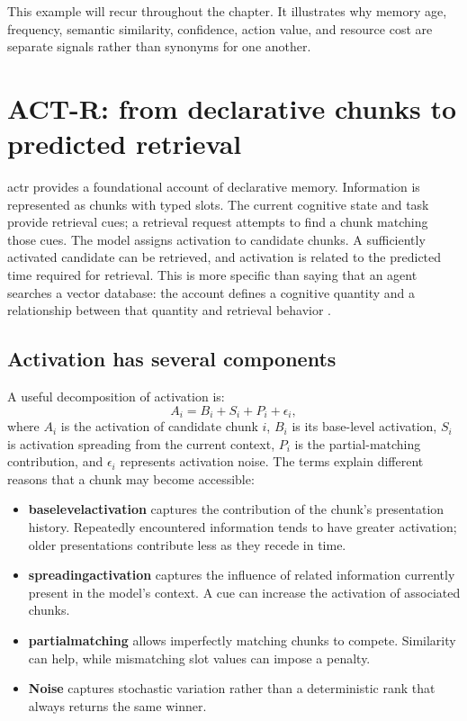 This example will recur throughout the chapter. It illustrates why memory age, frequency, semantic similarity, confidence, action value, and resource cost are separate signals rather than synonyms for one another.

\section{ACT-R: from declarative chunks to predicted retrieval}
\label{sec:ch12-actr}

\gls{actr} provides a foundational account of declarative memory. Information is represented as chunks with typed slots. The current cognitive state and task provide retrieval cues; a retrieval request attempts to find a chunk matching those cues. The model assigns activation to candidate chunks. A sufficiently activated candidate can be retrieved, and activation is related to the predicted time required for retrieval. This is more specific than saying that an agent searches a vector database: the account defines a cognitive quantity and a relationship between that quantity and retrieval behavior \autocite{anderson2007actr}\autocite[pp. 262--267]{actr7manual}.

\subsection{Activation has several components}
\label{subsec:ch12-activation-components}

A useful decomposition of \gls{activation} is:
\begin{equation}
  A_i = B_i + S_i + P_i + \epsilon_i,
  \label{eq:ch12-activation}
\end{equation}
where \(A_i\) is the activation of candidate chunk \(i\), \(B_i\) is its base-level activation, \(S_i\) is activation spreading from the current context, \(P_i\) is the partial-matching contribution, and \(\epsilon_i\) represents activation noise. The terms explain different reasons that a chunk may become accessible:

\begin{itemize}
  \item \textbf{\gls{baselevelactivation}} captures the contribution of the chunk's presentation history. Repeatedly encountered information tends to have greater activation; older presentations contribute less as they recede in time.
  \item \textbf{\gls{spreadingactivation}} captures the influence of related information currently present in the model's context. A cue can increase the activation of associated chunks.
  \item \textbf{\gls{partialmatching}} allows imperfectly matching chunks to compete. Similarity can help, while mismatching slot values can impose a penalty.
  \item \textbf{Noise} captures stochastic variation rather than a deterministic rank that always returns the same winner.
\end{itemize}


